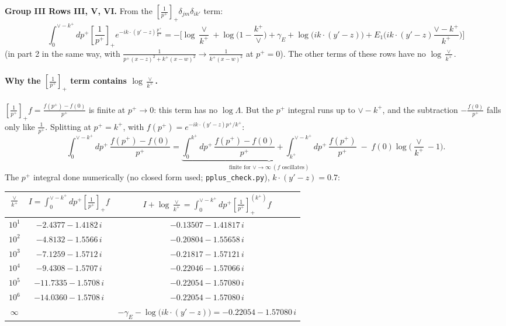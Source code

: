 \documentclass[9pt]{article}
\numberwithin{equation}{section}
\begin{document}
\textbf{Group III Rows III, V, VI.} From the $\left[\frac{1}{p^+}\right]_+\delta_{jm}\delta_{ik'}$ term:
\begin{equation*}
\int_0^{\vee-k^+}\!dp^+\left[\frac{1}{p^+}\right]_+e^{-ik\cdot(y'-z)\frac{p^+}{k^+}}=-\Big[\log\frac{\vee}{k^+}+\log\Big(1-\frac{k^+}{\vee}\Big)+\gamma_E+\log\big(ik\cdot(y'-z)\big)+E_1\Big(ik\cdot(y'-z)\frac{\vee-k^+}{k^+}\Big)\Big]
\end{equation*}
(in part 2 in the same way, with $\frac{1}{p^+(x-z)^2+k^+(x-w)^2}\to\frac{1}{k^+(x-w)^2}$ at $p^+=0$). The other terms of these rows have no $\log\frac{\vee}{k^+}$.

\paragraph{Why the $\left[\frac{1}{p^+}\right]_+$ term contains $\log\frac{\vee}{k^+}$.} $\left[\frac{1}{p^+}\right]_+f=\frac{f(p^+)-f(0)}{p^+}$ is finite at $p^+\to0$: this term has no $\log\Lambda$. But the $p^+$ integral runs up to $\vee-k^+$, and the subtraction $-\frac{f(0)}{p^+}$ falls only like $\frac{1}{p^+}$. Splitting at $p^+=k^+$, with $f(p^+)=e^{-ik\cdot(y'-z)p^+/k^+}$:
\begin{equation*}
\int_0^{\vee-k^+}\!dp^+\,\frac{f(p^+)-f(0)}{p^+}=\underbrace{\int_0^{k^+}\!dp^+\,\frac{f(p^+)-f(0)}{p^+}+\int_{k^+}^{\vee-k^+}\!dp^+\,\frac{f(p^+)}{p^+}}_{\text{finite for }\vee\to\infty\ (f\text{ oscillates})}\;-\;f(0)\log\Big(\frac{\vee}{k^+}-1\Big).
\end{equation*}
The $p^+$ integral done numerically (no closed form used; \texttt{pplus\_check.py}), $k\cdot(y'-z)=0.7$:
\begin{center}\small
\begin{tabular}{@{}ccc@{}}\hline
$\frac{\vee}{k^+}$ & $I=\int_0^{\vee-k^+}dp^+\left[\frac{1}{p^+}\right]_+f$ & $I+\log\frac{\vee}{k^+}=\int_0^{\vee-k^+}dp^+\left[\frac{1}{p^+}\right]_+^{(k^+)}f$\\\hline
$10^{1}$ & $-2.4377-1.4182\,i$ & $-0.13507-1.41817\,i$\\
$10^{2}$ & $-4.8132-1.5566\,i$ & $-0.20804-1.55658\,i$\\
$10^{3}$ & $-7.1259-1.5712\,i$ & $-0.21817-1.57121\,i$\\
$10^{4}$ & $-9.4308-1.5707\,i$ & $-0.22046-1.57066\,i$\\
$10^{5}$ & $-11.7335-1.5708\,i$ & $-0.22054-1.57080\,i$\\
$10^{6}$ & $-14.0360-1.5708\,i$ & $-0.22054-1.57080\,i$\\
$\infty$ & & $-\gamma_E-\log\big(ik\cdot(y'-z)\big)=-0.22054-1.57080\,i$\\\hline
\end{tabular}
\end{center}
\end{document}
